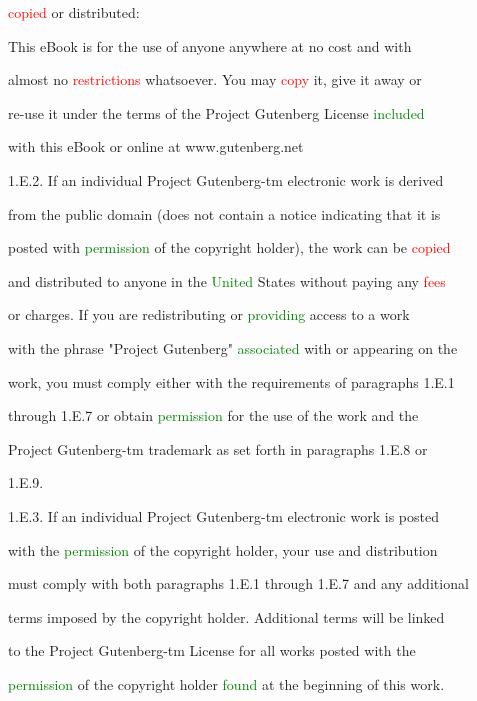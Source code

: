  \textcolor{red}{copied} or distributed:



 This eBook is for the use of anyone anywhere at no cost and with

 almost no \textcolor{red}{restrictions} whatsoever. You may \textcolor{red}{copy} it, give it away or

 re-use it under the terms of the Project Gutenberg License \textcolor{green}{included}

 with this eBook or online at www.gutenberg.net



 1.E.2. If an individual Project Gutenberg-tm electronic work is derived

 from the \textcolor{BurntOrange}{public} domain (does not contain a notice indicating that it is

 posted with \textcolor{green}{permission} of the copyright holder), the work can be \textcolor{red}{copied}

 and distributed to anyone in the \textcolor{green}{United} States without \textcolor{BurntOrange}{paying} any \textcolor{red}{fees}

 or charges. If you are redistributing or \textcolor{green}{providing} access to a work

 with the phrase "Project Gutenberg" \textcolor{green}{associated} with or appearing on the

 work, you must comply either with the requirements of paragraphs 1.E.1

 through 1.E.7 or obtain \textcolor{green}{permission} for the use of the work and the

 Project Gutenberg-tm trademark as set forth in paragraphs 1.E.8 or

 1.E.9.



 1.E.3. If an individual Project Gutenberg-tm electronic work is posted

 with the \textcolor{green}{permission} of the copyright holder, your use and distribution

 must comply with both paragraphs 1.E.1 through 1.E.7 and any additional

 terms imposed by the copyright holder. Additional terms will be linked

 to the Project Gutenberg-tm License for all works posted with the

 \textcolor{green}{permission} of the copyright holder \textcolor{green}{found} at the beginning of this work.



